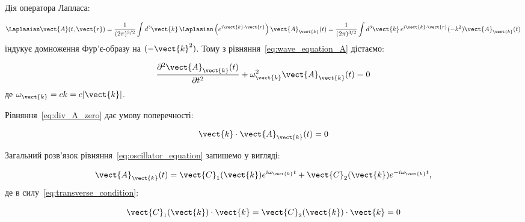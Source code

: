 Дія оператора Лапласа:

\begin{equation*}
	\Laplasian \vect{A}(t, \vect{r}) = \frac{1}{(2\pi)^{3/2}} \int d^3\vect{k} \, \Laplasian \left( e^{i\vect{k} \cdot \vect{r}} \right) \vect{A}_{\vect{k}}(t) =
	\frac{1}{(2\pi)^{3/2}} \int d^3\vect{k} \, e^{i\vect{k} \cdot \vect{r}} (-k^2) \vect{A}_{\vect{k}}(t)
\end{equation*}
індукує домноження Фур'є-образу на \((-\vect{k}^2)\). Тому з рівняння~\eqref{eq:wave_equation_A} дістаємо:

\begin{equation}
	\frac{\partial^2 \vect{A}_{\vect{k}}(t)}{\partial t^2} + \omega_{\vect{k}}^2 \vect{A}_{\vect{k}}(t) = 0
	\label{eq:oscillator_equation}
\end{equation}
де \(\omega_{\vect{k}} = ck = c|\vect{k}|\).

Рівняння~\eqref{eq:div_A_zero} дає умову поперечності:

\begin{equation}
	\vect{k} \cdot \vect{A}_{\vect{k}}(t) = 0
	\label{eq:transverse_condition}
\end{equation}

Загальний розв'язок рівняння~\eqref{eq:oscillator_equation} запишемо у вигляді:

\begin{equation}
	\vect{A}_{\vect{k}}(t) = \vect{C}_1(\vect{k}) e^{i\omega_{\vect{k}} t} + \vect{C}_2(\vect{k}) e^{-i\omega_{\vect{k}} t},
	\label{eq:general_solution_Ak}
\end{equation}
де в силу~\eqref{eq:transverse_condition}:

\begin{equation*}
	\vect{C}_1(\vect{k}) \cdot \vect{k} = \vect{C}_2(\vect{k}) \cdot \vect{k} = 0
\end{equation*}

